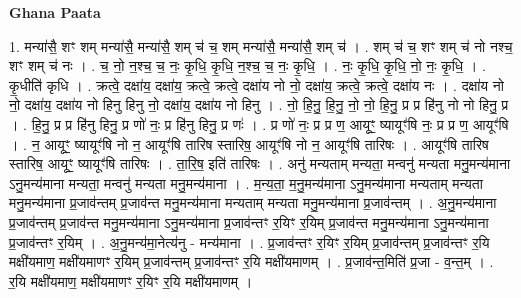 \documentclass[17pt]{extarticle}
\begin{document}
\textbf{Ghana Paata } \newline

1. मन्या॑सै॒ शꣳ शम् मन्या॑सै॒ मन्या॑सै॒ शम् च॑ च॒ शम् मन्या॑सै॒ मन्या॑सै॒ शम् च॑ । . शम् च॑ च॒ शꣳ शम् च॑ नो नश्च॒ शꣳ शम् च॑ नः । . च॒ नो॒ न॒श्च॒ च॒ नः॒ कृ॒धि॒ कृ॒धि॒ न॒श्च॒ च॒ नः॒ कृ॒धि॒ । . नः॒ कृ॒धि॒ कृ॒धि॒ नो॒ नः॒ कृ॒धि॒ । . कृ॒धीति॑ कृधि । . क्रत्वे॒ दक्षा॑य॒ दक्षा॑य॒ क्रत्वे॒ क्रत्वे॒ दक्षा॑य नो नो॒ दक्षा॑य॒ क्रत्वे॒ क्रत्वे॒ दक्षा॑य नः । . दक्षा॑य नो नो॒ दक्षा॑य॒ दक्षा॑य नो हिनु हिनु नो॒ दक्षा॑य॒ दक्षा॑य नो हिनु । . नो॒ हि॒नु॒ हि॒नु॒ नो॒ नो॒ हि॒नु॒ प्र प्र हि॑नु नो नो हिनु॒ प्र । . हि॒नु॒ प्र प्र हि॑नु हिनु॒ प्र णो॑ नः॒ प्र हि॑नु हिनु॒ प्र णः॑ । . प्र णो॑ नः॒ प्र प्र ण॒ आयूꣳ॒॒ ष्यायूꣳ॑षि नः॒ प्र प्र ण॒ आयूꣳ॑षि । . न॒ आयूꣳ॒॒ ष्यायूꣳ॑षि नो न॒ आयूꣳ॑षि तारिष स्तारिष॒ आयूꣳ॑षि नो न॒ आयूꣳ॑षि तारिषः । . आयूꣳ॑षि तारिष स्तारिष॒ आयूꣳ॒॒ ष्यायूꣳ॑षि तारिषः । . ता॒रि॒ष॒ इति॑ तारिषः । . अनु॑ मन्यताम् मन्यता॒ मन्वनु॑ मन्यता मनु॒मन्य॑माना ऽनु॒मन्य॑माना मन्यता॒ मन्वनु॑ मन्यता मनु॒मन्य॑माना । . म॒न्य॒ता॒ म॒नु॒मन्य॑माना ऽनु॒मन्य॑माना मन्यताम् मन्यता मनु॒मन्य॑माना प्र॒जाव॑न्तम् प्र॒जाव॑न्त मनु॒मन्य॑माना मन्यताम् मन्यता मनु॒मन्य॑माना प्र॒जाव॑न्तम् । . अ॒नु॒मन्य॑माना प्र॒जाव॑न्तम् प्र॒जाव॑न्त मनु॒मन्य॑माना ऽनु॒मन्य॑माना प्र॒जाव॑न्तꣳ र॒यिꣳ र॒यिम् प्र॒जाव॑न्त मनु॒मन्य॑माना ऽनु॒मन्य॑माना प्र॒जाव॑न्तꣳ र॒यिम् । . अ॒नु॒मन्य॑मा॒नेत्य॑नु - मन्य॑माना । . प्र॒जाव॑न्तꣳ र॒यिꣳ र॒यिम् प्र॒जाव॑न्तम् प्र॒जाव॑न्तꣳ र॒यि मक्षी॑यमाण॒ मक्षी॑यमाणꣳ र॒यिम् प्र॒जाव॑न्तम् प्र॒जाव॑न्तꣳ र॒यि मक्षी॑यमाणम् । . प्र॒जाव॑न्त॒मिति॑ प्र॒जा - व॒न्त॒म् । . र॒यि मक्षी॑यमाण॒ मक्षी॑यमाणꣳ र॒यिꣳ र॒यि मक्षी॑यमाणम् । \newline
\end{document}
